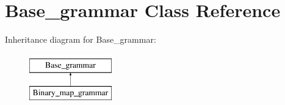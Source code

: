 \hypertarget{classBase__grammar}{}\section{Base\+\_\+grammar Class Reference}
\label{classBase__grammar}
Inheritance diagram for Base\+\_\+grammar\+:\begin{figure}[H]
\begin{center}
\leavevmode
\includegraphics[height=2.000000cm]{d7/d5a/classBase__grammar}
\end{center}
\end{figure}
